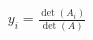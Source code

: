 \documentclass[preview]{standalone}
\begin{document}
\begin{align*}
y_i = \frac{\det(A_i)}{\det(A)}
\end{align*}
\end{document}
